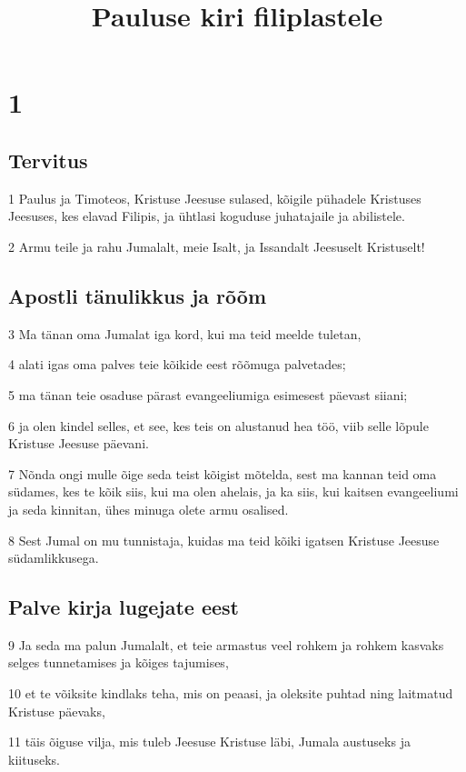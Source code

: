 

\title{Pauluse kiri filiplastele}

\chapter{1}

\section*{Tervitus}

\par 1 Paulus ja Timoteos, Kristuse Jeesuse sulased, kõigile pühadele Kristuses Jeesuses, kes elavad Filipis, ja ühtlasi koguduse juhatajaile ja abilistele.
\par 2 Armu teile ja rahu Jumalalt, meie Isalt, ja Issandalt Jeesuselt Kristuselt!

\section*{Apostli tänulikkus ja rõõm}

\par 3 Ma tänan oma Jumalat iga kord, kui ma teid meelde tuletan,
\par 4 alati igas oma palves teie kõikide eest rõõmuga palvetades;
\par 5 ma tänan teie osaduse pärast evangeeliumiga esimesest päevast siiani;
\par 6 ja olen kindel selles, et see, kes teis on alustanud hea töö, viib selle lõpule Kristuse Jeesuse päevani.
\par 7 Nõnda ongi mulle õige seda teist kõigist mõtelda, sest ma kannan teid oma südames, kes te kõik siis, kui ma olen ahelais, ja ka siis, kui kaitsen evangeeliumi ja seda kinnitan, ühes minuga olete armu osalised.
\par 8 Sest Jumal on mu tunnistaja, kuidas ma teid kõiki igatsen Kristuse Jeesuse südamlikkusega.

\section*{Palve kirja lugejate eest}

\par 9 Ja seda ma palun Jumalalt, et teie armastus veel rohkem ja rohkem kasvaks selges tunnetamises ja kõiges tajumises,
\par 10 et te võiksite kindlaks teha, mis on peaasi, ja oleksite puhtad ning laitmatud Kristuse päevaks,
\par 11 täis õiguse vilja, mis tuleb Jeesuse Kristuse läbi, Jumala austuseks ja kiituseks.

